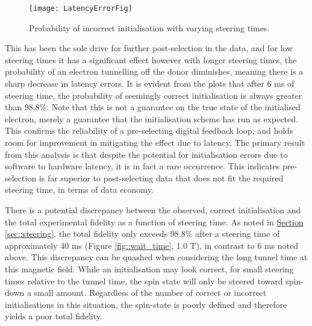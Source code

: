 	\begin{figure}[htb!]
		\centering
		\texttt{[image: LatencyErrorFig]}
		\caption{Probability of incorrect initialisation with varying steering times.}
		\label{fig::latency_errors}
	\end{figure}
	
	This has been the sole drive for further post-selection in the data, and for low steering times it has a significant effect however with longer steering times, the probability of an electron tunnelling off the donor diminishes, meaning there is a sharp decrease in latency errors. It is evident from the plots that after 6 ms of steering time, the probability of seemingly correct initialisation  is always greater than 98.8\%. Note that this is not a guarantee on the true state of the initialised electron, merely a guarantee that the initialisation scheme has run as expected. This confirms the reliability of a pre-selecting digital feedback loop, and holds room for improvement in mitigating the effect due to latency. The primary result from this analysis is that despite the potential for initialisation errors due to software to hardware latency, it is in fact a rare occurrence. This indicates pre-selection is far superior to post-selecting data that does not fit the required steering time, in terms of data economy. 
	
	There is a potential discrepancy between the observed, correct initialisation and the total experimental fidelity as a function of steering time. As noted in \hyperref[sec::steering]{Section \ref{sec::steering}}, the total fidelity only exceeds 98.8\% after a steering time of approximately 40 ms (Figure \ref{fig::wait_time}, 1.0 T), in contrast to 6 ms noted above. This discrepancy can be quashed when considering the long tunnel time at this magnetic field. While an initialisation may look correct, for small steering times relative to the tunnel time, the spin state will only be steered toward spin-down a small amount. Regardless of the number of correct or incorrect initialisations in this situation, the spin-state is poorly defined and therefore yields a poor total fidelity.
	